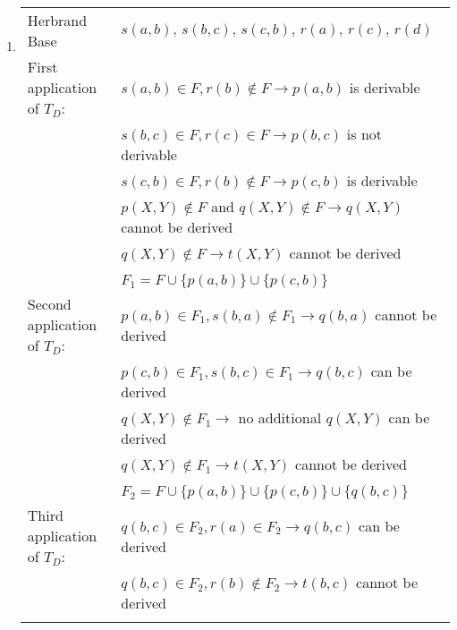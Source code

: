 \begin{exercise}{8}
\begin{subexercise}
\begin{enumerate}
      \item
        \begin{tabular}{l l}
            Herbrand Base & $s(a,b),\,s(b,c),\,s(c,b),\,r(a),\,r(c),\,r(d)$\\
            First application of $T_D$: & $s(a,b)\in F,r(b)\not\in F \rightarrow
                            p(a,b)$ is derivable \\
                                        & $s(b,c)\in F, r(c)\in F \rightarrow
                            p(b,c)$ is not derivable \\
                                        & $s(c,b)\in F, r(b)\not\in F
                            \rightarrow p(c,b)$ is derivable \\
                                        & $p(X,Y) \not \in F$ and $q(X,Y) \not
                                        \in F \rightarrow q(X,Y)$ cannot be
                                        derived \\
                                        & $q(X,Y) \not\in F \rightarrow t(X,Y)$
                                        cannot be derived \\  \\
                              & $F_1 = F \cup \{p(a,b)\} \cup \{p(c,b)\}$ \\ \hline

            Second application of $T_D$:  & $p(a,b)\in F_1, s(b,a)\not\in F_1
                            \rightarrow q(b,a)$ cannot be derived \\
                                          & $p(c,b)\in F_1, s(b,c)\in F_1
                            \rightarrow q(b,c)$ can be derived \\
                                          & $q(X,Y)\not\in F_1 \rightarrow$ no
                                          additional $q(X,Y)$ can be derived \\
                                          & $q(X,Y) \not\in F_1 \rightarrow t(X,Y)$
                                          cannot be derived \\  \\

                              & $F_2 = F \cup \{p(a,b)\} \cup \{p(c,b)\} \cup
                              \{q(b,c)\}$ \\ \hline
            Third application of $T_D$: & $q(b,c)\in F_2, r(a)\in F_2
                          \rightarrow q(b,c)$ can be derived \\
                                        & $q(b,c)\in F_2, r(b)\not\in F_2
                          \rightarrow t(b,c)$ cannot be derived \\ \\


\end{tabular}
\end{enumerate}
\end{subexercise}
\end{exercise}
